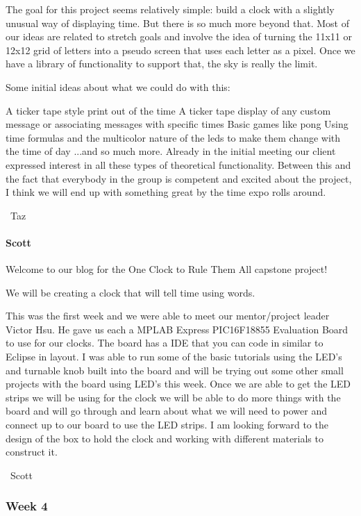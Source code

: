 \documentclass[onecolumn, draftclsnofoot,10pt, compsoc]{IEEEtran}
\begin{document}
The goal for this project seems relatively simple: build a clock with a slightly unusual way of displaying time. But there is so much more beyond that. Most of our ideas are related to stretch goals and involve the idea of turning the 11x11 or 12x12 grid of letters into a pseudo screen that uses each letter as a pixel. Once we have a library of functionality to support that, the sky is really the limit.

Some initial ideas about what we could do with this:

A ticker tape style print out of the time
A ticker tape display of any custom message or associating messages with specific times
Basic games like pong
Using time formulas and the multicolor nature of the leds to make them change with the time of day
...and so much more. Already in the initial meeting our client expressed interest in all these types of theoretical functionality. Between this and the fact that everybody in the group is competent and excited about the project, I think we will end up with something great by the time expo rolls around.

~Taz
\paragraph{Scott}
Welcome to our blog for the One Clock to Rule Them All capstone project!

We will be creating a clock that will tell time using words.

This was the first week and we were able to meet our mentor/project leader Victor Hsu. He gave us each a MPLAB Express PIC16F18855 Evaluation Board to use for our clocks. The board has a IDE that you can code in similar to Eclipse in layout. I was able to run some of the basic tutorials using the LED's and turnable knob built into the board and will be trying out some other small projects with the board using LED's this week. Once we are able to get the LED strips we will be using for the clock we will be able to do more things with the board and will go through and learn about what we will need to power and connect up to our board to use the LED strips. I am looking forward to the design of the box to hold the clock and working with different materials to construct it.

~Scott
\subsubsection{Week 4}
\end{document}

